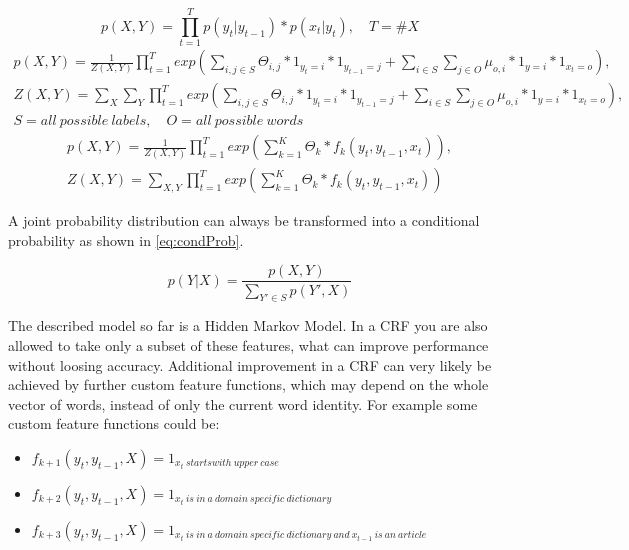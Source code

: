 \documentclass[12pt, twoside]{report}
\begin{document}
\begin{equation} \label{eq:jointProb}
p(X,Y) = \prod_{t=1}^T p(y_t|y_{t-1}) * p(x_t|y_t), \quad T = \#X
\end{equation}
\begin{align}\label{eq:magicTransoformation}
p(X,Y) = \frac{1}{Z(X,Y)}\prod_{t=1}^T exp(\sum_{i,j\in S}^{} \Theta_{i,j} * 1_{y_t=i} * 1_{y_{t-1}=j} + \sum_{i \in S}^{} \sum_{j \in O}^{} \mu_{o,i} * 1_{y=i} * 1_{x_t=o}), \nonumber
\\
Z(X,Y) = \sum_{X}^{}\sum_{Y}^{}\prod_{t=1}^T exp(\sum_{i,j\in S}^{} \Theta_{i,j} * 1_{y_t=i} * 1_{y_{t-1}=j} + \sum_{i \in S}^{} \sum_{j \in O}^{} \mu_{o,i} * 1_{y=i} * 1_{x_t=o}), \nonumber
\\
S = all\ possible\ labels, \quad O = all\ possible\ words
\end{align}
\begin{align} \label{eq:smartIndexing}
p(X,Y) = \frac{1}{Z(X,Y)}\prod_{t=1}^T exp(\sum_{k=1}^{K} \Theta_{k} * f_k(y_t, y_{t-1}, x_t)), \nonumber
\\
Z(X,Y) = \sum_{X,Y}^{}\prod_{t=1}^T exp(\sum_{k=1}^{K} \Theta_{k} * f_k(y_t, y_{t-1}, x_t))
\end{align}

A joint probability distribution can always be transformed into a conditional probability as shown in \cref{eq:condProb}.

\begin{equation}\label{eq:condProb}
p(Y|X) = \frac{p(X,Y)}{\sum_{Y'\in S}^{}p(Y', X)}
\end{equation}

The described model so far is a Hidden Markov Model. In a CRF you are also allowed to take only a subset of these features, what can improve performance without loosing accuracy. Additional improvement in a CRF can very likely be achieved by further custom feature functions, which may depend on the whole vector of words, instead of only the current word identity. For example some custom feature functions could be:

\begin{itemize}
\item $f_{k+1}(y_t, y_{t-1}, X) = 1_{x_t\ starts with\ upper\ case}$
\item $f_{k+2}(y_t, y_{t-1}, X) = 1_{x_t\ is\ in\ a\ domain\ specific\ dictionary}$
\item $f_{k+3}(y_t, y_{t-1}, X) = 1_{x_t\ is\ in\ a\ domain\ specific\ dictionary\ and\ x_{t-1}\ is\ an\ article}$
\end{itemize}
\end{document}
